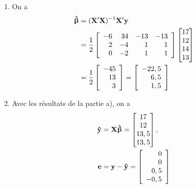\begin{solution}{3.7}
    \begin{enumerate}
    \item On a
      \begin{align*}
        \boldsymbol{\hat{\upbeta}}
        &= (\mathbf{X}^\prime \mathbf{X})^{-1} \mathbf{X}^\prime \mathbf{y} \\
        &= \frac{1}{2}
        \left[
          \begin{array}{rrrr}
            -6 & 34 & -13 & -13 \\
            2 & -4 &   1 &   1 \\
            0 & -2 & 1 & 1
          \end{array}
        \right]
        \begin{bmatrix}
          17 \\ 12 \\ 14 \\ 13
        \end{bmatrix} \\
        &= \frac{1}{2}
        \left[
          \begin{array}{r}
            -45 \\ 13 \\ 3
          \end{array}
        \right] =
        \left[
          \begin{array}{r}
            -22,5 \\ 6,5 \\ 1,5
          \end{array}
        \right]
      \end{align*}
    \item Avec les résultats de la partie a), on a
      \begin{align*}
        \mathbf{\hat{y}} &= \mathbf{X} \boldsymbol{\hat{\upbeta}} =
        \begin{bmatrix}
          17 \\ 12 \\ 13,5 \\ 13,5
        \end{bmatrix}, \\
        \mathbf{e} &= \mathbf{y} - \mathbf{\hat{y}} =
        \left[
          \begin{array}{r}
            0 \\ 0 \\ 0,5 \\ -0,5
          \end{array}
        \right]
      \end{align*}

\end{enumerate}
\end{solution}
